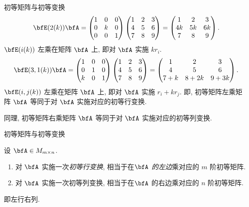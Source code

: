 \begin{frame}{初等矩阵与初等变换}
	\onslide<+->
	\[\bfE(2(k))\bfA=\begin{pmatrix}
		1&0&0\\
		0&k&0\\
		0&0&1
	\end{pmatrix}\begin{pmatrix}
		1&2&3\\
		4&5&6\\
		7&8&9
	\end{pmatrix}=\begin{pmatrix}
		1&2&3\\
		4k&5k&6k\\
		7&8&9
	\end{pmatrix}.\]
	\onslide<+->
	$\bfE(i(k))$ 左乘在矩阵 $\bfA$ 上, 即对 $\bfA$ 实施 $kr_i$.
	\onslide<+->
	\[\bfE(3,1(k))\bfA=\begin{pmatrix}
		1&0&0\\
		0&1&0\\
		k&0&1
	\end{pmatrix}\begin{pmatrix}
		1&2&3\\
		4&5&6\\
		7&8&9
	\end{pmatrix}=\begin{pmatrix}
		1&2&3\\
		4&5&6\\
		7+k&8+2k&9+3k
	\end{pmatrix}.\]
	\onslide<+->
	$\bfE(i,j(k))$ 左乘在矩阵 $\bfA$ 上, 即对 $\bfA$ 实施 $r_i+kr_j$.
	\onslide<+->
	即, 初等矩阵左乘矩阵 $\bfA$ 等同于对 $\bfA$ 实施对应的初等行变换.

	\onslide<+->
	同理, 初等矩阵右乘矩阵 $\bfA$ 等同于对 $\bfA$ 实施对应的初等列变换.
\end{frame}


\begin{frame}{初等矩阵与初等变换}
	\onslide<+->
	\begin{theorem}
		设 $\bfA\in M_{m\times n}$.
		\begin{enumerate}
			\item 对 $\bfA$ 实施一次\emph{初等行变换}, 相当于在\emph{$\bfA$ 的左边}乘对应的 $m$ 阶初等矩阵.
			\item 对 $\bfA$ 实施一次\alert{初等列变换}, 相当于在\alert{$\bfA$ 的右边}乘对应的 $n$ 阶初等矩阵.
		\end{enumerate}
	\end{theorem}
	\onslide<+->
	即\alert{左行右列}.
\end{frame}


